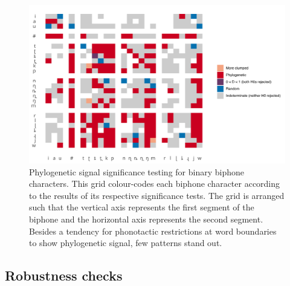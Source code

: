 \begin{figure}

{\centering \includegraphics[width=0.9\linewidth]{05-phylo-signal/fig/d-sig-swatch} 

}

\caption{Phylogenetic signal significance testing for binary biphone characters. This grid colour-codes each biphone character according to the results of its respective significance tests. The grid is arranged such that the vertical axis represents the first segment of the biphone and the horizontal axis represents the second segment. Besides a tendency for phonotactic restrictions at word boundaries to show phylogenetic signal, few patterns stand out.}\label{fig:d-swatch}
\end{figure}

\hypertarget{phy-sig-bin-robustness}{%
\subsection{Robustness checks}\label{phy-sig-bin-robustness}}

